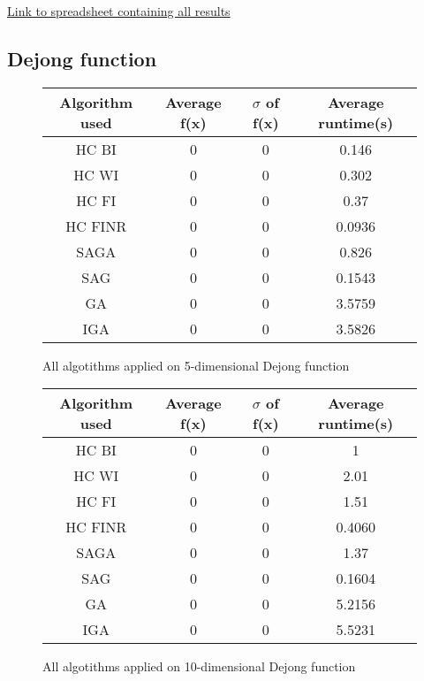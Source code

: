 \documentclass{article}
\begin{document}
\href{./h2.xlsx}{Link to spreadsheet containing all results}

\subsection{Dejong function}

\begin{figure}[H]
	\begin{tabular}{|c||c|c|c|} \hline
		Algorithm used & Average f(x) & $\sigma$ of f(x) & Average runtime(s) \\ \hline \hline
		HC BI & 0 & 0 & 0.146 \\ \hline
		HC WI & 0 & 0 & 0.302 \\ \hline
		HC FI & 0 & 0 & 0.37 \\ \hline
		HC FINR & 0 & 0 & 0.0936 \\ \hline
		SAGA & 0 & 0 & 0.826 \\ \hline
		SAG & 0 & 0 & 0.1543 \\ \hline
        GA & 0 & 0 & 3.5759 \\ \hline
		IGA & 0 & 0 & 3.5826 \\ \hline
\end{tabular}
\caption{All algotithms applied on 5-dimensional Dejong function}
\end{figure}

\begin{figure}[H]
	\begin{tabular}{|c||c|c|c|} \hline
		Algorithm used & Average f(x) & $\sigma$ of f(x) & Average runtime(s) \\ \hline \hline
		HC BI & 0 & 0 & 1 \\ \hline
		HC WI & 0 & 0 & 2.01 \\ \hline
		HC FI & 0 & 0 & 1.51 \\ \hline
		HC FINR & 0 & 0 & 0.4060 \\ \hline
		SAGA & 0 & 0 & 1.37 \\ \hline
		SAG & 0 & 0 & 0.1604 \\ \hline
        GA & 0 & 0 & 5.2156 \\ \hline
		IGA & 0 & 0 & 5.5231 \\ \hline
\end{tabular}
\caption{All algotithms applied on 10-dimensional Dejong function}
\end{figure}
\end{document}
